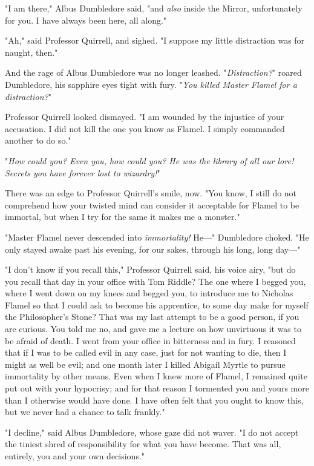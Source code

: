 "I am there," Albus Dumbledore said, "and \emph{also} inside the Mirror,
unfortunately for you. I have always been here, all along."

"Ah," said Professor Quirrell, and sighed. "I suppose my little distraction was
for naught, then."

And the rage of Albus Dumbledore was no longer leashed. "\emph{Distraction?}"
roared Dumbledore, his sapphire eyes tight with fury. "\emph{You killed Master
Flamel for a distraction?}"

Professor Quirrell looked dismayed. "I am wounded by the injustice of your
accusation. I did not kill the one you know as Flamel. I simply commanded
another to do so."

"\emph{How could you? Even you, how could you? He was the library of all our
lore! Secrets you have forever lost to wizardry!}"

There was an edge to Professor Quirrell's smile, now. "You know, I still do not
comprehend how your twisted mind can consider it acceptable for Flamel to be
immortal, but when I try for the same it makes me a monster."

"Master Flamel never descended into \emph{immortality!} He---" Dumbledore
choked. "He only stayed awake past his evening, for our sakes, through his
long, long day---"

"I don't know if you recall this," Professor Quirrell said, his voice airy,
"but do you recall that day in your office with Tom Riddle? The one where I
begged you, where I went down on my knees and begged you, to introduce me to
Nicholas Flamel so that I could ask to become his apprentice, to some day make
for myself the Philosopher's Stone? That was my last attempt to be a good
person, if you are curious. You told me no, and gave me a lecture on how
unvirtuous it was to be afraid of death. I went from your office in bitterness
and in fury. I reasoned that if I was to be called evil in any case, just for
not wanting to die, then I might as well be evil; and one month later I killed
Abigail Myrtle to pursue immortality by other means. Even when I knew more of
Flamel, I remained quite put out with your hypocrisy; and for that reason I
tormented you and yours more than I otherwise would have done. I have often
felt that you ought to know this, but we never had a chance to talk frankly."

"I decline," said Albus Dumbledore, whose gaze did not waver. "I do not accept
the tiniest shred of responsibility for what you have become. That was all,
entirely, you and your own decisions."

